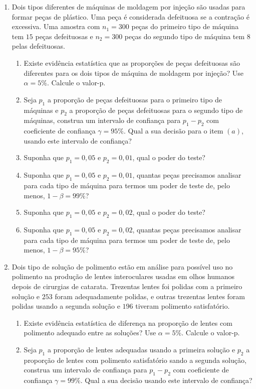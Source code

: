 \documentclass[8pt, a4paper]{article}
\begin{document}
\begin{enumerate}
	\item Dois tipos diferentes de máquinas de moldagem por injeção são usadas para formar peças de plástico. Uma peça é considerada defeituosa se a contração é excessiva. Uma amostra com $n_1=300$ peças do primeiro tipo de máquina tem $15$ peças defeituosas e $n_2=300$ peças do segundo tipo de máquina tem $8$ pelas defeituosas.
	\begin{enumerate}
		\item Existe evidência estatística que as proporções de peças defeituosas são diferentes para os dois tipos de máquina de moldagem por injeção? Use $\alpha=5\%$. Calcule o valor-p.
		\item Seja $p_1$ a proporção de peças defeituosas para o primeiro tipo de máquinas e $p_2$ a proporção de peças defeituosas para o segundo tipo de máquinas, construa um intervalo de confiança para $p_1 - p_2$ com coeficiente de confiança $\gamma=95\%$. Qual a sua decisão para o item $(a)$, usando este intervalo de confiança?
		\item Suponha que $p_1=0,05$ e $p_2 = 0,01$, qual o poder do teste?
		\item  Suponha que $p_1=0,05$ e $p_2 = 0,01$, quantas peças precisamos analisar para cada tipo de máquina para termos um poder de teste de, pelo menos, $1-\beta=99\%$?
		\item Suponha que $p_1=0,05$ e $p_2 = 0,02$, qual o poder do teste?
		\item  Suponha que $p_1=0,05$ e $p_2 = 0,02$, quantas peças precisamos analisar para cada tipo de máquina para termos um poder de teste de, pelo menos, $1-\beta=95\%$?
	\end{enumerate}

	\item Dois tipo de solução de polimento estão em análise para possível uso no polimento na produção de lentes  interoculares usadas em olhos humanos depois de cirurgias de catarata. Trezentas lentes foi polidas com a primeiro solução e $253$ foram adequadamente polidas, e outras trezentas lentes foram polidas usando a segunda solução e $196$ tiveram polimento satisfatório.
	\begin{enumerate}
		\item Existe evidência estatística de diferença na proporção de lentes com polimento adequado entre as soluções? Use $\alpha = 5\%$. Calcule o valor-p.
		\item Seja $p_1$ a proporção de lentes adequadas usando a primeira solução e $p_2$ a proporção de lentes com polimento satisfatório sando a segunda solução, construa um intervalo de confiança para $p_1 - p_2$ com coeficiente de confiança $\gamma=99\%$. Qual a sua decisão usando este intervalo de confiança?
	\end{enumerate}


\end{enumerate}
\end{document}
